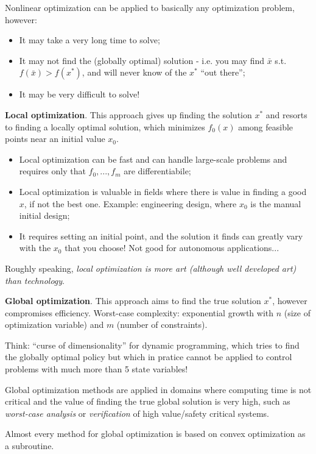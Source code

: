 Nonlinear optimization can be applied to basically any optimization problem, however:

\begin{itemize}
\item It may take a very long time to solve;
\item It may not find the (globally optimal) solution - i.e. you may find $\bar x$ s.t. $f(\bar x) > f(x^*)$, and will never know of the $x^*$ ``out there'';
\item It may be very difficult to solve!
\end{itemize}

\begin{Example}
  \textbf{Local optimization}. This approach gives up finding the solution $x^*$ and resorts to finding a locally optimal solution, which minimizes $f_0(x)$ among feasible points near an initial value $x_0$.
  \begin{itemize}
  \item Local optimization can be fast and can handle large-scale problems and requires only that $f_0,...,f_m$ are differentiabile;
  \item Local optimization is valuable in fields where there is value in finding a good $x$, if not the best one. Example: engineering design, where $x_0$ is the manual initial design;
  \item It requires setting an initial point, and the solution it finds can greatly vary with the $x_0$ that you choose! Not good for autonomous applications...
  \end{itemize}

  Roughly speaking, \textit{local optimization is more art (although well developed art) than technology}.
\end{Example}

\begin{Example}
  \textbf{Global optimization}. This approach aims to find the true solution $x^*$, however compromises efficiency. Worst-case complexity: exponential growth with $n$ (size of optimization variable) and $m$ (number of constraints).

  \begin{Fact}
    Think: ``curse of dimensionality'' for dynamic programming, which tries to find the globally optimal policy but which in pratice cannot be applied to control problems with much more than 5 state variables!
  \end{Fact}

  Global optimization methods are applied in domains where computing time is not critical and the value of finding the true global solution is very high, such as \textit{worst-case analysis} or \textit{verification} of high value/safety critical systems.

  \begin{Fact}
    Almost every method for global optimization is based on convex optimization as a subroutine.
  \end{Fact}
  
\end{Example}

